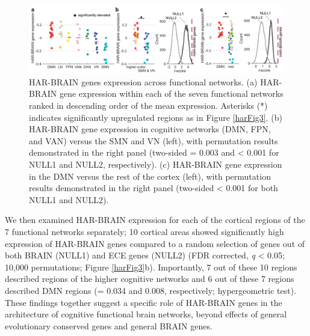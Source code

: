 \begin{refsection}
\begin{figure}[h]
    \centering
    \includegraphics[width=\linewidth]{images/harFig4.png}
    \caption{HAR-BRAIN genes expression across functional networks. (a) HAR-BRAIN gene expression within each of the seven functional networks ranked in descending order of the mean expression. Asterisks (*) indicates significantly upregulated regions as in Figure \ref{harFig3}. (b) HAR-BRAIN gene expression in cognitive networks (DMN, FPN, and VAN) versus the SMN and VN (left), with permutation results demonstrated in the right panel (two-sided \pval = 0.003 and \pval < 0.001 for NULL1 and NULL2, respectively). (c) HAR-BRAIN gene expression in the DMN versus the rest of the cortex (left), with permutation results demonstrated in the right panel (two-sided \pval < 0.001 for both NULL1 and NULL2).}
    \label{harFig4}
\end{figure}

We then examined HAR-BRAIN expression for each of the cortical regions of the 7 functional networks separately; 10 cortical areas showed significantly high expression of HAR-BRAIN genes compared to a random selection of genes out of both BRAIN (NULL1) and ECE genes (NULL2) (FDR corrected, \textit{q} < 0.05; 10,000 permutations; Figure \ref{harFig3}b). Importantly, 7 out of these 10 regions described regions of the higher cognitive networks and 6 out of these 7 regions described DMN regions (\pval = 0.034 and 0.008, respectively; hypergeometric test). These findings together suggest a specific role of HAR-BRAIN genes in the architecture of cognitive functional brain networks, beyond effects of general evolutionary conserved genes and general BRAIN genes.


\end{refsection}
